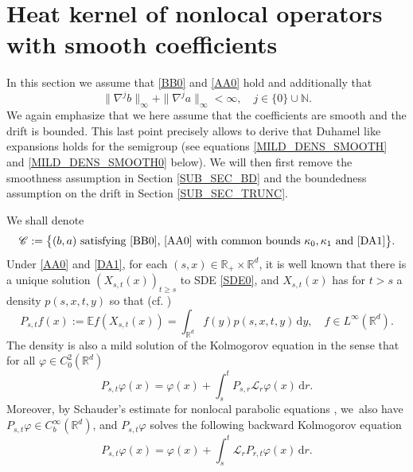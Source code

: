 \documentclass[JEP,XML,SOM,Unicode,published]{cedram}
\theoremstyle{plain}
\theoremstyle{definition}
\newcommand\mE{\mathbb{E}}
\newcommand\mN{\mathbb{N}}
\newcommand\mR{\mathbb{R}}
\newcommand\1{{\mathbf{1}}}
\newcommand\sC{{\mathscr C}}
\newcommand{\dif}{\,\mathrm{d}}
\begin{document}
\section{Heat kernel of nonlocal operators with smooth coefficients}
\label{SEC_HK_SMOOTH_COEFF}
In this section we assume that \eqref{BB0} and \eqref{AA0} hold and additionally that
\begin{equation}\label{DA1}
\|\nabla^jb\|_\infty+\|\nabla^ja\|_\infty<\infty,\quad j\in\{0\}\cup\mN.
\end{equation}
We again emphasize that we here assume that the coefficients are smooth and the drift is bounded. This last point precisely allows to derive that Duhamel like expansions holds for the semigroup (see equations \eqref{MILD_DENS_SMOOTH} and \eqref{MILD_DENS_SMOOTH0} below). We will then first remove the smoothness assumption in Section \ref{SUB_SEC_BD} and the boundedness assumption on the drift in Section \ref{SUB_SEC_TRUNC}.

We shall denote
\[
\sC:=\big\{(b,a) \text{ satisfying \eqref{BB0}, \eqref{AA0} with common bounds $\kappa_0,\kappa_1$ and \eqref{DA1}}\big\}.
\]
Under \eqref{AA0} and \eqref{DA1},
for each $(s,x)\in\mR_+\times\mR^d$,
it is well known that there is a unique solution $(X_{s,t}(x))_{t\geq s}$ to SDE \eqref{SDE0},
and $X_{s,t}(x)$ has for $t>s$ a density $p(s,x,t,y)$ so that (cf. \cite{De-Fo, CHZ})\vspace*{-3pt}
\[
P_{s,t} f(x):=\mE f(X_{s,t}(x))=\int_{\mR^d}f(y)p(s,x,t,y)\dif y,\quad f\in L^\infty(\mR^d).
\]
The density is also a mild solution of the Kolmogorov equation in the sense that for all $\varphi\in C_0^2(\mR^d) $\vspace*{-3pt}
\begin{equation}
\label{MILD_DENS_SMOOTH}
P_{s,t} \varphi(x)=\varphi(x)+\int_s^t P_{s,r}\mathscr L_r \varphi (x)\dif r.
\end{equation}
Moreover, by Schauder's estimate for nonlocal parabolic equations \cite[Th.\,3.5]{Zh-Zh}, we~also have $P_{s,t}\varphi\in C^\infty_b(\mR^d)$, and
$P_{s,t}\varphi$ solves the following backward Kolmogorov equation\vspace*{-3pt}
\begin{equation}
\label{MILD_DENS_SMOOTH0}
P_{s,t} \varphi(x)=\varphi(x)+\int_s^t\mathscr L_r P_{r,t}\varphi (x)\dif r.
\end{equation}
\end{document}
